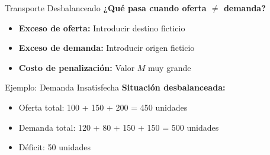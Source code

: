 \documentclass{beamer}
\begin{document}
\begin{frame}{Transporte Desbalanceado}
    \textbf{¿Qué pasa cuando oferta $\neq$ demanda?}
    \begin{itemize}
        \item<1-> \textbf{Exceso de oferta:} Introducir destino ficticio
        \item<2-> \textbf{Exceso de demanda:} Introducir origen ficticio
        \item<3-> \textbf{Costo de penalización:} Valor $M$ muy grande
    \end{itemize}
    
    \vspace{1em}
\end{frame}

\begin{frame}{Ejemplo: Demanda Insatisfecha}
    \textbf{Situación desbalanceada:}
    \begin{itemize}
        \item Oferta total: 100 + 150 + 200 = 450 unidades
        \item Demanda total: 120 + 80 + 150 + 150 = 500 unidades
        \item Déficit: 50 unidades
    \end{itemize}
\end{frame}
\end{document}
